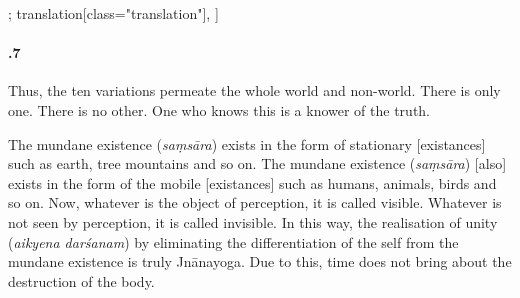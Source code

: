 \begin{alignment}[
  texts=edition[class="edition"];
  translation[class="translation"],
  ]
\begin{translation}
\begin{tlate}[21_7]
     \paragraph{.7} Thus, the ten variations permeate the whole world and non-world. There is only one. There is no other. One who knows this is a knower of the truth.
     \\
     \end{tlate}
\begin{tlate}[p21_02]
 The mundane existence (\textit{saṃsāra}) exists in the form of stationary [existances] such as earth, tree mountains and so on. The mundane existence (\textit{saṃsāra}) [also] exists in the form of the mobile [existances] such as humans, animals, birds and so on. Now, whatever is the object of perception, it is called visible. Whatever is not seen by perception, it is called invisible. In this way, the realisation of unity (\textit{aikyena darśanam}) by eliminating the differentiation of the self from the mundane existence is truly Jnānayoga. Due to this, time does not bring about the destruction of the body.
 \flushpage
    \end{tlate}
  \end{translation}
\end{alignment}
\pagebreak %
